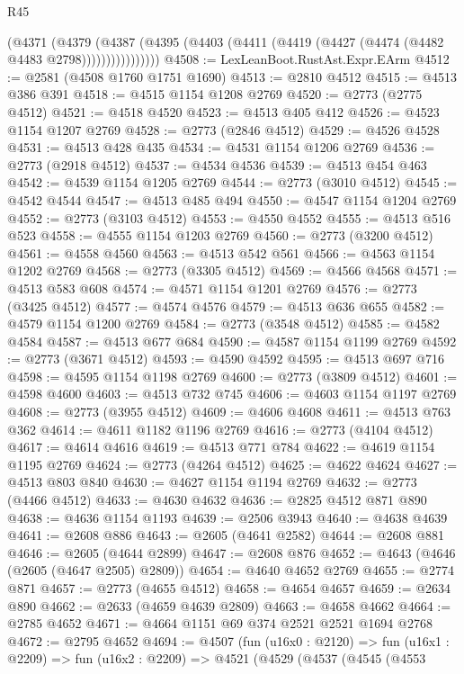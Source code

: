 \begin{lexlean}{R45}
\begin{coremodule}
                (@4371
                  (@4379
                    (@4387
                      (@4395 (@4403 (@4411 (@4419 (@4427 (@4474 (@4482 @4483 @2798))))))))))))))))
@4508 := LexLeanBoot.RustAst.Expr.EArm
@4512 := @2581 (@4508 @1760 @1751 @1690)
@4513 := @2810 @4512
@4515 := @4513 @386 @391
@4518 := @4515 @1154 @1208 @2769
@4520 := @2773 (@2775 @4512)
@4521 := @4518 @4520
@4523 := @4513 @405 @412
@4526 := @4523 @1154 @1207 @2769
@4528 := @2773 (@2846 @4512)
@4529 := @4526 @4528
@4531 := @4513 @428 @435
@4534 := @4531 @1154 @1206 @2769
@4536 := @2773 (@2918 @4512)
@4537 := @4534 @4536
@4539 := @4513 @454 @463
@4542 := @4539 @1154 @1205 @2769
@4544 := @2773 (@3010 @4512)
@4545 := @4542 @4544
@4547 := @4513 @485 @494
@4550 := @4547 @1154 @1204 @2769
@4552 := @2773 (@3103 @4512)
@4553 := @4550 @4552
@4555 := @4513 @516 @523
@4558 := @4555 @1154 @1203 @2769
@4560 := @2773 (@3200 @4512)
@4561 := @4558 @4560
@4563 := @4513 @542 @561
@4566 := @4563 @1154 @1202 @2769
@4568 := @2773 (@3305 @4512)
@4569 := @4566 @4568
@4571 := @4513 @583 @608
@4574 := @4571 @1154 @1201 @2769
@4576 := @2773 (@3425 @4512)
@4577 := @4574 @4576
@4579 := @4513 @636 @655
@4582 := @4579 @1154 @1200 @2769
@4584 := @2773 (@3548 @4512)
@4585 := @4582 @4584
@4587 := @4513 @677 @684
@4590 := @4587 @1154 @1199 @2769
@4592 := @2773 (@3671 @4512)
@4593 := @4590 @4592
@4595 := @4513 @697 @716
@4598 := @4595 @1154 @1198 @2769
@4600 := @2773 (@3809 @4512)
@4601 := @4598 @4600
@4603 := @4513 @732 @745
@4606 := @4603 @1154 @1197 @2769
@4608 := @2773 (@3955 @4512)
@4609 := @4606 @4608
@4611 := @4513 @763 @362
@4614 := @4611 @1182 @1196 @2769
@4616 := @2773 (@4104 @4512)
@4617 := @4614 @4616
@4619 := @4513 @771 @784
@4622 := @4619 @1154 @1195 @2769
@4624 := @2773 (@4264 @4512)
@4625 := @4622 @4624
@4627 := @4513 @803 @840
@4630 := @4627 @1154 @1194 @2769
@4632 := @2773 (@4466 @4512)
@4633 := @4630 @4632
@4636 := @2825 @4512 @871 @890
@4638 := @4636 @1154 @1193
@4639 := @2506 @3943
@4640 := @4638 @4639
@4641 := @2608 @886
@4643 := @2605 (@4641 @2582)
@4644 := @2608 @881
@4646 := @2605 (@4644 @2899)
@4647 := @2608 @876
@4652 := @4643 (@4646 (@2605 (@4647 @2505) @2809))
@4654 := @4640 @4652 @2769
@4655 := @2774 @871
@4657 := @2773 (@4655 @4512)
@4658 := @4654 @4657
@4659 := @2634 @890
@4662 := @2633 (@4659 @4639 @2809)
@4663 := @4658 @4662
@4664 := @2785 @4652
@4671 := @4664 @1151 @69 @374 @2521 @2521 @1694 @2768
@4672 := @2795 @4652
@4694 := @4507
    (fun (u16x0 : @2120) =>
    fun (u16x1 : @2209) =>
    fun (u16x2 : @2209) =>
    @4521
      (@4529
        (@4537
          (@4545
            (@4553

\end{coremodule}
\end{lexlean}
